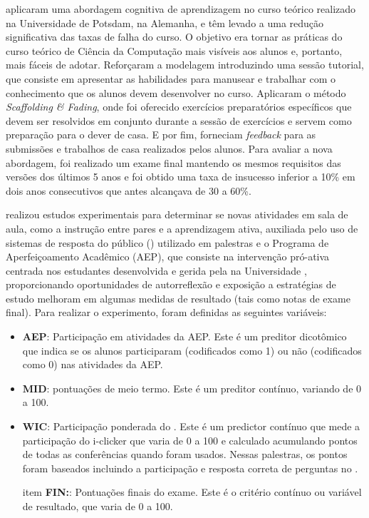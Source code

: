  aplicaram uma abordagem cognitiva de aprendizagem no curso teórico realizado na Universidade de Potsdam, na Alemanha, e têm levado a uma redução significativa das taxas de falha do curso. O objetivo era tornar as práticas do curso teórico de Ciência da Computação mais visíveis aos alunos e, portanto, mais fáceis de adotar. Reforçaram a modelagem introduzindo uma sessão tutorial, que consiste em apresentar as habilidades para manusear e trabalhar com o conhecimento que os alunos devem desenvolver no curso. Aplicaram o método \textit{Scaffolding \& Fading}, onde foi oferecido exercícios preparatórios específicos que devem ser resolvidos em conjunto durante a sessão de exercícios e servem como preparação para o dever de casa. E por fim, forneciam \textit{feedback} para as submissões e trabalhos de casa realizados pelos alunos. Para avaliar a nova abordagem, foi realizado um exame final mantendo os mesmos requisitos das versões dos últimos 5 anos e foi obtido uma taxa de insucesso inferior a 10\% em dois anos consecutivos que antes alcançava de 30 a 60\%.

 realizou estudos experimentais para determinar se novas atividades em sala de aula, como a instrução entre pares e a aprendizagem ativa, auxiliada pelo uso de sistemas de resposta do público () utilizado em palestras e o Programa de Aperfeiçoamento Acadêmico (AEP), que consiste na intervenção pró-ativa centrada nos estudantes desenvolvida e gerida pela  na Universidade , proporcionando oportunidades de autorreflexão e exposição a estratégias de estudo melhoram em algumas medidas de resultado (tais como notas de exame final). Para realizar o experimento, foram definidas as seguintes variáveis:

\begin{itemize}
	\item \textbf{AEP}: Participação em atividades da AEP. Este é um preditor dicotômico que indica se os alunos participaram (codificados como 1) ou não (codificados como 0) nas atividades da AEP.
	
	\item \textbf{MID}: pontuações de meio termo. Este é um preditor contínuo, variando de 0 a 100.
	
	\item \textbf{WIC}: Participação ponderada do . Este é um predictor contínuo que mede a participação do i-clicker que varia de 0 a 100 e calculado acumulando pontos de todas as conferências quando  foram usados. Nessas palestras, os pontos foram baseados incluindo a participação e resposta correta de perguntas no .
	
	item \textbf{FIN:}: Pontuações finais do exame. Este é o critério contínuo ou variável de resultado, que varia de 0 a 100.
\end{itemize}

